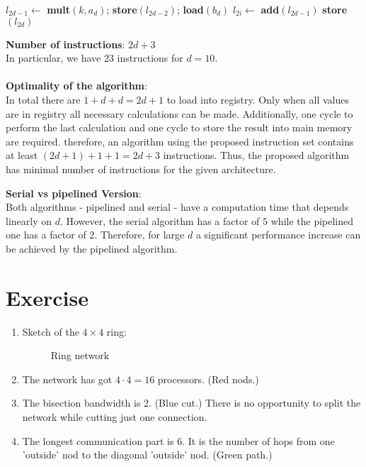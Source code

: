 \documentclass{article}
\begin{document}
\begin{enumerate}[label=(\alph*)]
\begin{algorithmic}[1]
      \EndFor
      \State $l_{2d-1} \gets $ \textbf{mult}$(k,a_d)$; \textbf{store}$(l_{2d-2})$; \textbf{load}$(b_d)$
      \State $l_{2i} \gets $ \textbf{add}$(l_{2d-1})$
      \State \textbf{store}$(l_{2d})$
    \end{algorithmic}
    \textbf{Number of instructions}: $2d+3$ \\
    In particular, we have 23 instructions for $d = 10$. \\ \\
    \textbf{Optimality of the algorithm}: \\
    In total there are $1+d+d = 2d +1 $ to load into registry. Only when all values are in registry all necessary calculations can be made. Additionally, one cycle to perform the last calculation and one cycle to store the result into main memory are required. therefore, an algorithm using the proposed instruction set contains at least $(2d+1) + 1 + 1 = 2d + 3$ instructions. Thus, the proposed algorithm has minimal number of instructions for the given architecture. 

    \textbf{Serial vs pipelined Version}: \\
    Both algorithms - pipelined and serial - have a computation time that depends linearly on $d$. However, the serial algorithm has a factor of $5$ while the pipelined one has a factor of $2$. Therefore, for large $d$ a significant performance increase can be achieved by the pipelined algorithm.
\end{enumerate}

\section{Exercise}
\begin{enumerate}[label=(\alph*)]
  \item Sketch of the $4\times 4$ ring:
    \begin{figure}[H]
      \centering
      
      \caption{Ring network}
    \end{figure}

  \item The network has got $4\cdot 4 =16$ processors. (Red nods.)
  \item The bisection bandwidth is 2. (Blue cut.) There is no opportunity to split the network while cutting just one connection.
  \item The longest communication part is 6. It is the number of hops from one 'outside' nod to the diagonal 'outside' nod. (Green path.)
\end{enumerate}




\end{document}
